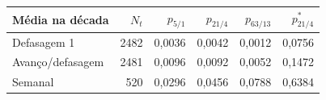 \begin{tabular}{lrrrrr}
\toprule
Média na década & $N_t$ & $p_{5/1}$ & $p_{21/4}$ & $p_{63/13}$ & $p^*_{21/4}$\\
\midrule
Defasagem 1 & 2482 & 0,0036 & 0,0042 & 0,0012 & 0,0756\\
Avanço/defasagem & 2481 & 0,0096 & 0,0092 & 0,0052 & 0,1472\\
Semanal & 520 & 0,0296 & 0,0456 & 0,0788 & 0,6384\\
\bottomrule
\end{tabular}
